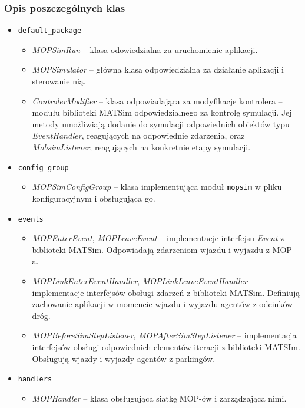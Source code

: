 \subsubsection{Opis poszczególnych klas}
\begin{itemize}
    \item \texttt{default\_package}
        \begin{itemize}
        \item \textit{MOPSimRun} -- klasa odowiedzialna za uruchomienie aplikacji.
        \item \textit{MOPSimulator} -- główna klasa odpowiedzialna za działanie aplikacji i sterowanie nią.
        \item \textit{ControlerModifier} -- klasa odpowiadająca za modyfikacje kontrolera -- modułu biblioteki MATSim odpowiedzialnego za kontrolę symulacji. Jej metody umożliwiają dodanie do symulacji odpowiednich obiektów typu \textit{EventHandler}, reagujących na odpowiednie zdarzenia, oraz \textit{MobsimListener}, reagujących na konkretnie etapy symulacji.
        \end{itemize}
    \item \texttt{config\_group}
        \begin{itemize}
            \item \textit{MOPSimConfigGroup} -- klasa implementująca moduł \texttt{mopsim} w pliku konfiguracyjnym i obsługująca go.
        \end{itemize}
    \item \texttt{events}
        \begin{itemize}
            \item \textit{MOPEnterEvent}, \textit{MOPLeaveEvent} -- implementacje interfejsu \textit{Event} z biblioteki MATSim. Odpowiadają zdarzeniom wjazdu i wyjazdu z MOP-a.
            \item \textit{MOPLinkEnterEventHandler}, \textit{MOPLinkLeaveEventHandler} -- implementacje interfejsów obsługi zdarzeń z biblioteki MATSim. Definiują zachowanie aplikacji w momencie wjazdu i wyjazdu agentów z odcinków dróg.
            \item \textit{MOPBeforeSimStepListener}, \textit{MOPAfterSimStepListener} -- implementacja interfejsów obsługi odpowiednich elementów iteracji z biblioteki MATSIm. Obsługują wjazdy i wyjazdy agentów z parkingów.
        \end{itemize}
    \item \texttt{handlers}
        \begin{itemize}
            \item \textit{MOPHandler} -- klasa obsługująca siatkę MOP-ów i zarządzająca nimi.

\end{itemize}
\end{itemize}
